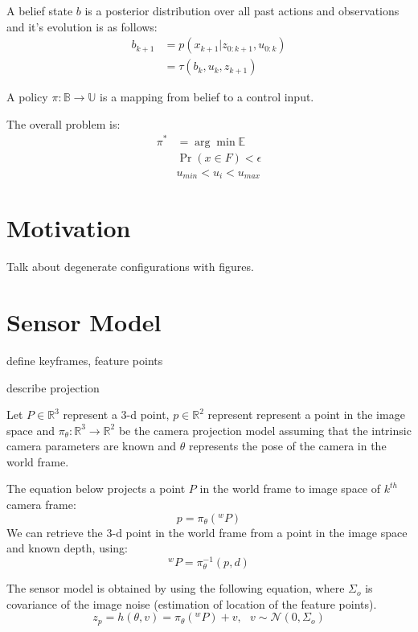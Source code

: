 \documentclass[conference]{IEEEtran}
\begin{document}
A belief state $b$ is a posterior distribution over all past actions and observations and it's evolution is as follows:
\begin{align}
    b_{k+1} &= p(x_{k+1}|z_{0:k+1}, u_{0:k}) \\
            &= \tau(b_k,u_k,z_{k+1})
\end{align} 

A policy $\pi : \mathbb{B} \to \mathbb{U}$ is a mapping from belief to a control input.

 The overall problem is:
\begin{align}
\pi^{*} &= \arg\min \mathbb{E}\\
\nonumber & \Pr(x\in F) < \epsilon \\
\nonumber & u_{min} < u_i < u_{max}
\end{align}

\section{Motivation}
Talk about degenerate configurations with figures.

\section{Sensor Model}

define keyframes, feature points

describe projection

Let $P \in \mathbb{R}^{3}$ represent a 3-d point, $p \in \mathbb{R}^2$ represent represent a point in the image space and $\pi_\theta:\mathbb{R}^3\to\mathbb{R}^2$ be the camera projection model assuming that the intrinsic camera parameters are known and $\theta$ represents the pose of the camera in the world frame.

The equation below projects a point $P$ in the world frame to image space of $k^{th}$ camera frame:
\begin{equation} p=\pi_\theta(^{w}P) \end{equation}
We can retrieve the 3-d point in the world frame from a point in the image space and known depth, using: 
\begin{equation} ^{w}P=\pi^{-1}_\theta(p,d) \end{equation}

The sensor model is obtained by using the following equation, where $\Sigma_o$ is covariance of the image noise (estimation of location of the feature points).
\begin{equation}
     z_p = h(\theta,v)=
     \pi_\theta(^w P) + v,~~~ v\sim \mathcal{N}(0,\Sigma_{o})
     \label{eq:ObsModel}
\end{equation}
\end{document}

